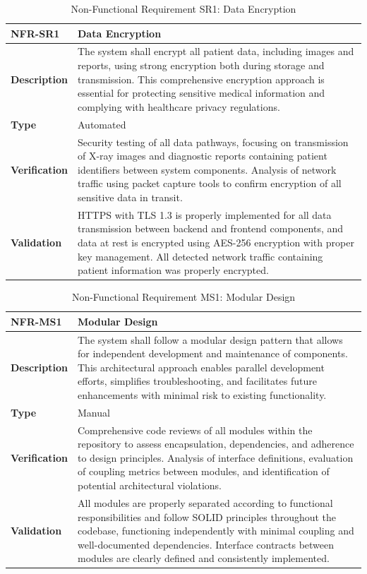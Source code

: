 \documentclass[12pt, titlepage]{article}
\begin{document}
\begin{table}[h!]
\centering
{}
\begin{tabular}{|p{3.5cm}|p{11.5cm}|}
\hline
\rowcolor{gray!30}
\textbf{NFR-SR1} & \textbf{Data Encryption} \\
\hline
\textbf{Description} & The system shall encrypt all patient data, including images and reports, using strong encryption both during storage and transmission. This comprehensive encryption approach is essential for protecting sensitive medical information and complying with healthcare privacy regulations. \\
\hline
\textbf{Type} & Automated \\
\hline
\textbf{Verification} & Security testing of all data pathways, focusing on transmission of X-ray images and diagnostic reports containing patient identifiers between system components. Analysis of network traffic using packet capture tools to confirm encryption of all sensitive data in transit. \\
\hline
\textbf{Validation} & HTTPS with TLS 1.3 is properly implemented for all data transmission between backend and frontend components, and data at rest is encrypted using AES-256 encryption with proper key management. All detected network traffic containing patient information was properly encrypted. \\
\hline
\end{tabular}
\caption{Non-Functional Requirement SR1: Data Encryption}
\end{table}

\begin{table}[h!]
\centering
{}
\begin{tabular}{|p{3.5cm}|p{11.5cm}|}
\hline
\rowcolor{gray!30}
\textbf{NFR-MS1} & \textbf{Modular Design} \\
\hline
\textbf{Description} & The system shall follow a modular design pattern that allows for independent development and maintenance of components. This architectural approach enables parallel development efforts, simplifies troubleshooting, and facilitates future enhancements with minimal risk to existing functionality. \\
\hline
\textbf{Type} & Manual \\
\hline
\textbf{Verification} & Comprehensive code reviews of all modules within the repository to assess encapsulation, dependencies, and adherence to design principles. Analysis of interface definitions, evaluation of coupling metrics between modules, and identification of potential architectural violations. \\
\hline
\textbf{Validation} & All modules are properly separated according to functional responsibilities and follow SOLID principles throughout the codebase, functioning independently with minimal coupling and well-documented dependencies. Interface contracts between modules are clearly defined and consistently implemented. \\
\hline
\end{tabular}
\caption{Non-Functional Requirement MS1: Modular Design}
\end{table}
\end{document}
